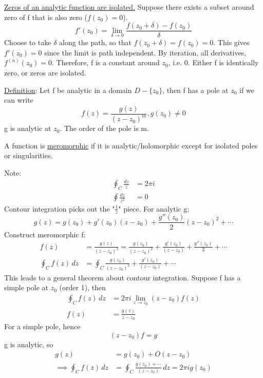 \documentclass[a4paper, 11pt, normalem]{report}
\begin{document}
\underline{Zeros of an analytic function are isolated.}
Suppose there exists a subset around zero of f that is also zero ($f(z_0) = 0$).
\begin{equation}
    f'(z_0) = \lim_{\delta\to 0} \frac{f(z_0 + \delta) - f(z_0)}{\delta}
\end{equation}
Choose to take $\delta$ along the path, so that $f(z_0 + \delta) = f(z_0) = 0$.
This gives $f'(z_0) = 0$ since the limit is path independent.
By iteration, all derivatives, $f^{(n)}(z_0) = 0$.
Therefore, f is a constant around $z_0$, i.e. 0.
Either f is identically zero, or zeros are isolated.

\underline{Definition}: Let f be analytic in a domain $D - \{z_0\}$, then f has a pole at $z_0$ if we can write
\begin{equation}
    f(z) = \frac{g(z)}{(z-z_0)^m}, g(z_0) \neq 0
\end{equation}
g is analytic at $z_0$.
The order of the pole is m.

A function is \underline{meromorphic} if it is analytic/holomorphic except for isolated poles or singularities.

Note:
\begin{align}
    \oint_C \frac{dz}{z} &= 2\pi i \\
    \oint \frac{dz}{z^2} &= 0
\end{align}
Contour integration picks out the "$\frac{1}{z}$" piece.
For analytic g:
\begin{equation}
    g(z) = g(z_0) + g'(z_0)(z-z_0) + \frac{g''(z_0)}{2}(z-z_0)^2 + \cdots
\end{equation}
Construct meromorphic f:
\begin{align}
    f(z) &= \frac{g(z)}{(z-z_0)^2} = \frac{g(z_0)}{(z-z_0)^2} + \frac{g'(z_0)}{(z-z_0)} + \frac{g''(z_0)}{2} + \cdots \\
    \oint_C f(z)\,dz &= \oint_C \frac{g(z_0)}{(z-z_0)^2} + \frac{g'(z_0)}{(z-z_0)} + \cdots
\end{align}
This leads to a general theorem about contour integration.
Suppose f has a simple pole at $z_0$ (order 1), then
\begin{align}
    \oint_C f(z)\,dz &= 2\pi i\lim_{z\to z_0} (z-z_0)f(z) \\
    f(z) &= \frac{g(z)}{z-z_0}
\end{align}
For a simple pole, hence
\begin{equation}
    (z-z_0)f = g
\end{equation}
g is analytic, so
\begin{align}
    g(z) &= g(z_0) + O(z-z_0) \\
    \implies \oint_C f(z)\,dz &= \oint_C \frac{g(z_0) + \cdots}{(z-z_0)}\,dz = 2\pi ig(z_0)
\end{align}
\end{document}
